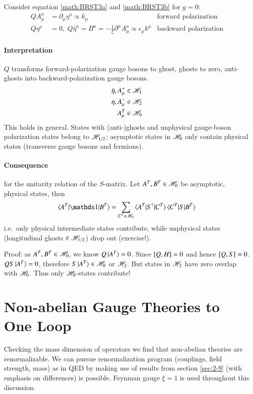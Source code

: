 Consider equation \ref{math:BRST3a} and \ref{math:BRST3b} for $g=0$:
\begin{align*}
   Q A_\mu^a &= \partial_\mu \eta^a \propto k_\mu &\text{forward polarization} \\
   Q \eta^a &= 0, \; Q\bar{\eta}^a = B^a = - \frac{1}{\xi} \partial^\mu A_\mu^a \propto \epsilon_\mu k^\mu &\text{backward polarization}
\end{align*}

\paragraph{Interpretation}
$Q$ transforms forward-polarization gauge bosons to ghost, ghosts to zero, anti-ghosts into backward-polarization gauge bosons.
\begin{align*}
   \bar{\eta}, A^+_\mu &\in \mathscr{H}_1 \\ 
 \eta, A^-_\mu &\in \mathscr{H}_2 \\ 
 A_\mu^T &\in \mathscr{H}_0
\end{align*}
This holds in general. States with (anti-)ghosts and unphysical gauge-boson polarization states belong to $\mathscr{H}_{1/2}$; asymptotic states in $\mathscr{H}_0$ only contain physical states (transverse gauge bosons and fermions).

\paragraph{Consequence} for the unitarity relation of the $S$-matrix. Let $A^T, B^T \in \mathscr{H}_0$ be asymptotic, physical states, then
\begin{align*}
   \braket{ A^T | \id | B^T} = \sum_{C^T \in \hil_0} \braket{A^T| S^\dagger | C^T} \braket{C^T | S | B^T} 
\end{align*}
i.e.~only physical intermediate states contribute, while unphysical states (longitudinal ghosts $\in \mathscr{H}_{1/2}$) drop out (exercise!).

Proof: as $A^T, B^T \in \mathscr{H}_0$, we know $Q \ket{A^T} = 0$. Since $\comm{Q}{H} = 0$ and hence $\comm{Q}{S} = 0$.
$Q S \ket{A^T} = 0$, therefore $S \ket{A^T} \in \mathscr{H}_0$ or $\mathscr{H}_2$. But states in $\mathscr{H}_2$ have zero overlap with $\mathscr{H}_0$. Thus only $\mathscr{H}_0$-states contribute!

\section{Non-abelian Gauge Theories to One Loop}
Checking the mass dimension of operators we find that non-abelian theories are renormalizable. We can pursue renormalization program (couplings, field strength, mass) as in QED by making use of results from section \ref{sec:2-9} (with emphasis on differences) is possible. Feynman gauge $\xi=1$ is used throughout this discussion.

